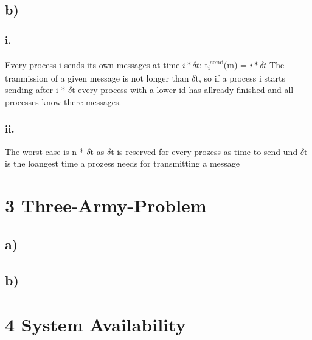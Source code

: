 \documentclass{scrartcl}
\begin{document}
\subsection*{b)}
\subsubsection*{i.}
Every process i sends its own messages at time $ i * \delta t$:
t\textsubscript{i}\textsuperscript{send}(m) = $ i * \delta t $
The tranmission of a given message is not longer than $ \delta $t, so if a process i starts sending after i * $ \delta $t every process with a lower id has allready finished and all processes know there messages.
\subsubsection*{ii.}
The worst-case is n * $ \delta $t as $ \delta $t is reserved for every prozess as time to send und $ \delta $t is the loangest time a prozess needs for transmitting a message


\section*{3 Three-Army-Problem}
\subsection*{a)}
\subsection*{b)}

\section*{4 System Availability}
\end{document}
